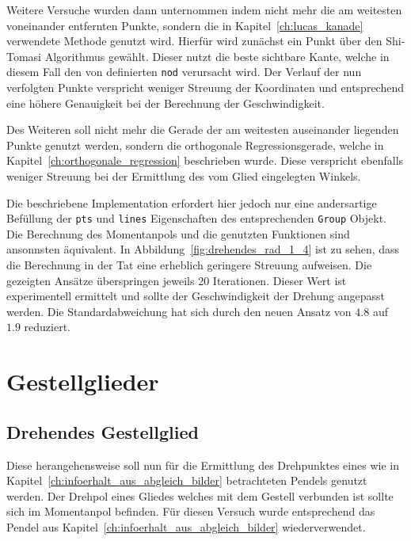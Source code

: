 Weitere Versuche wurden dann unternommen indem nicht mehr die am weitesten voneinander entfernten Punkte, sondern die in Kapitel~\ref{ch:lucas_kanade} verwendete Methode genutzt wird.
Hierfür wird zunächst ein Punkt über den Shi-Tomasi Algorithmus gewählt.
Dieser nutzt die beste sichtbare Kante, welche in diesem Fall den von  definierten \lstinline{nod} verursacht wird.
Der Verlauf der nun verfolgten Punkte verspricht weniger Streuung der Koordinaten und entsprechend eine höhere Genauigkeit bei der Berechnung der Geschwindigkeit.

Des Weiteren soll nicht mehr die Gerade der am weitesten auseinander liegenden Punkte genutzt werden, sondern die orthogonale Regressionsgerade, welche in Kapitel~\ref{ch:orthogonale_regression} beschrieben wurde.
Diese verspricht ebenfalls weniger Streuung bei der Ermittlung des vom Glied eingelegten Winkels.

Die beschriebene Implementation erfordert hier jedoch nur eine andersartige Befüllung der \lstinline{pts} und \lstinline{lines} Eigenschaften des entsprechenden \lstinline{Group} Objekt.
Die Berechnung des Momentanpols und die genutzten Funktionen sind ansonnsten äquivalent.
In Abbildung~\ref{fig:drehendes_rad_1_4} ist zu sehen, dass die Berechnung in der Tat eine erheblich geringere Streuung aufweisen.
Die gezeigten Ansätze überspringen jeweils 20 Iterationen.
Dieser Wert ist experimentell ermittelt und sollte der Geschwindigkeit der Drehung angepasst werden.
Die Standardabweichung hat sich durch den neuen Ansatz von $4.8$ auf $1.9$ reduziert.

\section{Gestellglieder}

\subsection{Drehendes Gestellglied}

Diese herangehensweise soll nun für die Ermittlung des Drehpunktes eines wie in Kapitel~\ref{ch:infoerhalt_aus_abgleich_bilder} betrachteten Pendels genutzt werden.
Der Drehpol eines Gliedes welches mit dem Gestell verbunden ist sollte sich im Momentanpol befinden.
Für diesen Versuch wurde entsprechend das Pendel aus Kapitel~\ref{ch:infoerhalt_aus_abgleich_bilder} wiederverwendet.

